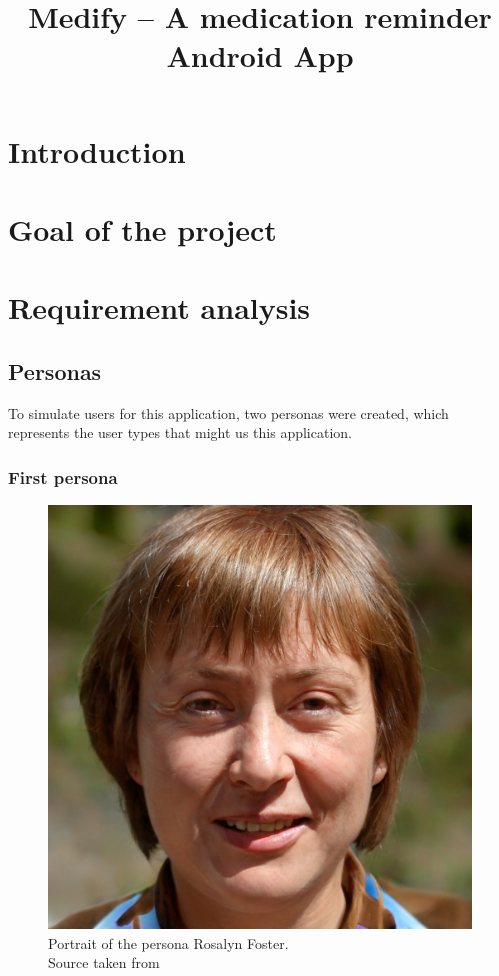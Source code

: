 \documentclass[conference]{IEEEtran}
\begin{document}
\title{Medify -- A medication reminder Android App}

\author{
}

\maketitle

\begin{abstract}
\lipsum[1][1-4] %
\end{abstract}

\section{Introduction}
\lipsum[2][1-10] %

\section{Goal of the project}
\lipsum[3][1-13] %

\section{Requirement analysis}

\subsection{Personas}
To simulate users for this application, two personas were created, which represents the user types
that might us this application.

\subsubsection{First persona} \hfill
\begin{figure}[h]
	\centerline{\includegraphics[width=.5\linewidth]{images/persona01.jpg}}
	\caption[Portrait of the persona Rosalyn Foster; Source taken from \cite{personaimg}]
	{Portrait of the persona Rosalyn Foster.\\ Source taken from \cite{personaimg}\endtabular}
	\label{fig:persona1}
\end{figure}
\end{document}
